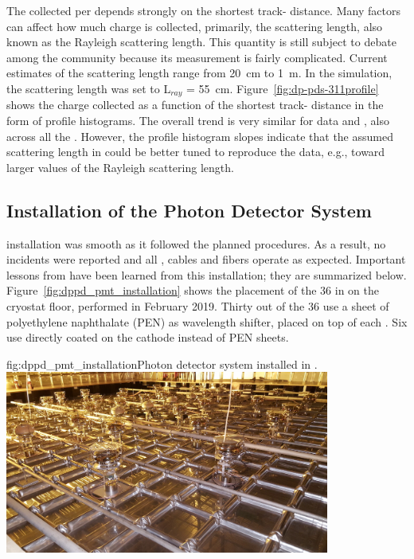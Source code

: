 
The  collected per  depends strongly on the shortest track- distance. Many factors can affect how much charge is collected, primarily, the scattering length, also known as the Rayleigh scattering length. This quantity is still subject to debate among the  community because its measurement is fairly complicated. Current estimates of the scattering length range from \SI{20}{\cm} to \SI{1}{\m}.
In the  simulation, the scattering length was set to L$_{ray}$ = \SI{55}{\cm}.
Figure~\ref{fig:dp-pds-311profile} shows the charge collected as a function of the shortest track- distance in the form of profile histograms. The overall trend is very similar for data and , also across all the . However, the profile histogram slopes indicate that the assumed scattering length in  could be better tuned to reproduce the data, e.g., toward larger values of the Rayleigh scattering length.


\subsection{Installation of the  Photon Detector System}

  installation was smooth as it followed the planned procedures. As a result, no incidents were reported and all , cables and fibers operate as expected. Important lessons from  have been learned from this installation; %
they are summarized below. Figure~\ref{fig:dppd_pmt_installation} shows the placement of the \num{36}  in  on the cryostat floor, performed in February 2019.
 Thirty out of the \num{36}  use a sheet of polyethylene naphthalate
(PEN) as wavelength shifter, placed on top of each . Six  use  directly coated on
the  cathode instead of PEN sheets.

\begin{dunefigure}{fig:dppd_pmt_installation}{Photon detector system installed in .}
\includegraphics[width=0.8\textwidth]{graphics/dppd_pmt_installation.jpg}
\end{dunefigure}


